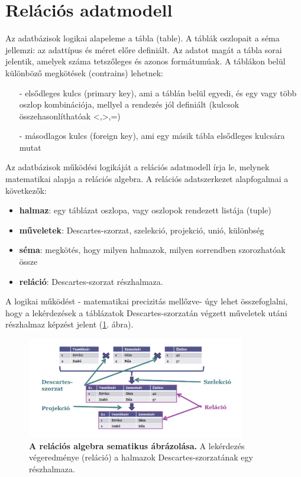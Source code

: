 \documentclass[12pt]{article}
\theoremstyle{plain}
\begin{document}
\section{Relációs adatmodell}

Az adatbázisok logikai alapeleme a tábla (table). A táblák oszlopait a séma jellemzi: az adattípus és méret előre definiált. Az adatot magát a tábla sorai jelentik, amelyek száma tetszőleges és azonos formátumúak. A táblákon belül különböző megkötések (contrains) lehetnek: 
\begin{itemize}
    \item[-]elsődleges kulcs (primary key), ami a táblán belül egyedi, és egy vagy több oszlop kombinációja, mellyel a rendezés jól definiált (kulcsok összehasonlíthatóak <,>,=) 
    \item[-]másodlagos kulcs (foreign key), ami egy másik tábla elsődleges kulcsára mutat
\end{itemize}{}
Az adatbázisok működési logikáját a relációs adatmodell írja le, melynek matematikai alapja a relációs algebra. A relációs adatszerkezet alapfogalmai a következők:
\begin{itemize}
    \item \textbf{halmaz}: egy táblázat oszlopa, vagy oszlopok rendezett listája (tuple)
    \item \textbf{műveletek}: Descartes-szorzat, szelekció, projekció, unió, különbség
    \item \textbf{séma}: megkötés, hogy milyen halmazok, milyen sorrendben szorozhatóak össze
    \item \textbf{reláció}: Descartes-szorzat részhalmaza.
\end{itemize}{}
A logikai működést - matematikai precizitás mellőzve- úgy lehet összefoglalni, hogy a lekérdezések a táblázatok Descartes-szorzatán végzett műveletek utáni részhalmaz képzést jelent (\ref{fig:rel}. ábra).


\begin{figure}[H]
    \begin{center}
    \includegraphics[width=0.85\textwidth]{media/rel.png}
    \caption{\textbf{A relációs algebra sematikus ábrázolása.} A lekérdezés végeredménye (reláció) a halmazok Descartes-szorzatának egy részhalmaza.} 
    \label{fig:rel}
    \end{center}
\end{figure}
\end{document}
